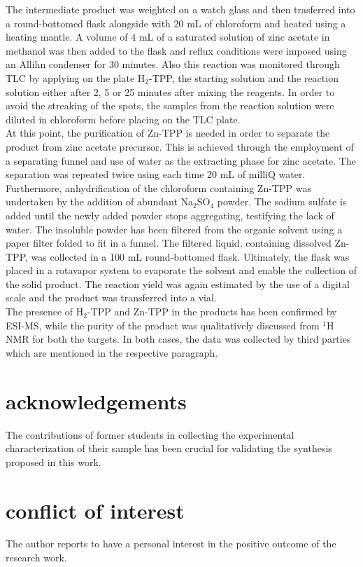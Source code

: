 \documentclass[twoside,twocolumn,9pt]{article}
\begin{document}
The intermediate product was weighted on a watch glass and then trasferred into a round-bottomed flask alongside with 20 mL of chloroform and heated using a heating mantle.
A volume of 4 mL of a saturated solution of zinc acetate in methanol was then added to the flask and reflux conditions were imposed using an Allihn condenser for 30 minutes.
Also this reaction was monitored through TLC by applying on the plate H$_{2}$-TPP, the starting solution and the reaction solution either after 2, 5 or 25 minutes after mixing the reagents.
In order to avoid the streaking of the spots, the samples from the reaction solution were diluted in chloroform before placing on the TLC plate.\\
\break
At this point, the purification of Zn-TPP is needed in order to separate the product from zinc acetate precursor.
This is achieved through the employment of a separating funnel and use of water as the extracting phase for zinc acetate.
The separation was repeated twice using each time 20 mL of milliQ water.
Furthermore, anhydrification of the chloroform containing Zn-TPP was undertaken by the addition of abundant Na$_{2}$SO$_{4}$ powder.
The sodium sulfate is added until the newly added powder stops aggregating, testifying the lack of water.
The insoluble powder has been filtered from the organic solvent using a paper filter folded to fit in a funnel.
The filtered liquid, containing dissolved Zn-TPP, was collected in a 100 mL round-bottomed flask.
Ultimately, the flask was placed in a rotavapor system to evaporate the solvent and enable the collection of the solid product.
The reaction yield was again estimated by the use of a digital scale and the product was transferred into a vial.\\
The presence of H$_{2}$-TPP and Zn-TPP in the products has been confirmed by ESI-MS, while the purity of the product was qualitatively discussed from $^{1}$H NMR for both the targets.
In both cases, the data was collected by third parties which are mentioned in the respective paragraph.

\section*{acknowledgements}
The contributions of former students in collecting the experimental characterization of their sample has been crucial for validating the synthesis proposed in this work.
\section*{conflict of interest}
The author reports to have a personal interest in the positive outcome of the research work.
\end{document}

